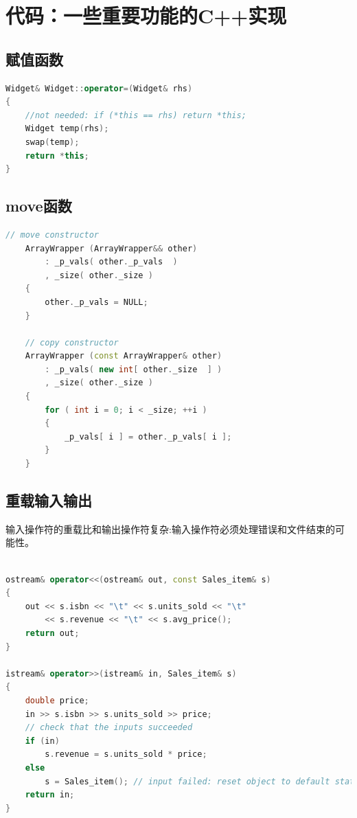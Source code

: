 
\section{代码：一些重要功能的C++实现}

\subsection{赋值函数}
\begin{lstlisting}[language=C++]
Widget& Widget::operator=(Widget& rhs)
{
	//not needed: if (*this == rhs) return *this;
	Widget temp(rhs);
	swap(temp);
	return *this;
}
\end{lstlisting}

\subsection{move函数}
\begin{lstlisting}[language=C++]
// move constructor  
    ArrayWrapper (ArrayWrapper&& other)  
        : _p_vals( other._p_vals  )  
        , _size( other._size )  
    {  
        other._p_vals = NULL;  
    }  
   
    // copy constructor  
    ArrayWrapper (const ArrayWrapper& other)  
        : _p_vals( new int[ other._size  ] )  
        , _size( other._size )  
    {  
        for ( int i = 0; i < _size; ++i )  
        {  
            _p_vals[ i ] = other._p_vals[ i ];  
        }  
    }  
\end{lstlisting}


\subsection{重载输入输出}


输入操作符的重载比和输出操作符复杂:输入操作符必须处理错误和文件结束的可能性。
\begin{lstlisting}[language=C++]

ostream& operator<<(ostream& out, const Sales_item& s)
{
	out << s.isbn << "\t" << s.units_sold << "\t"
		<< s.revenue << "\t" << s.avg_price();
	return out;
}

istream& operator>>(istream& in, Sales_item& s)
{
	double price;
	in >> s.isbn >> s.units_sold >> price;
	// check that the inputs succeeded
	if (in)
		s.revenue = s.units_sold * price;
	else
		s = Sales_item(); // input failed: reset object to default state
	return in;
}

\end{lstlisting}

